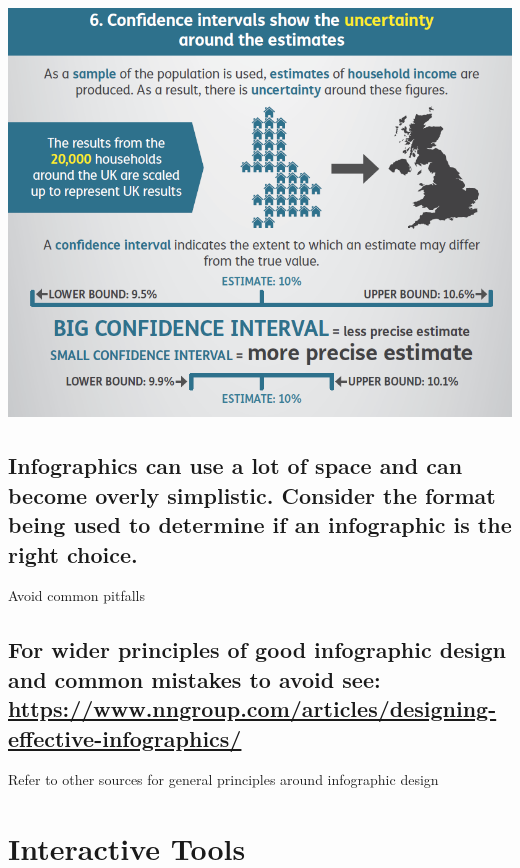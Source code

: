 \documentclass[]{book}
\begin{document}
\begin{center}\includegraphics{images/infographic} \end{center}

\subsection{Infographics can use a lot of space and can become overly
simplistic. Consider the format being used to determine if an
infographic is the right
choice.}\label{infographics-can-use-a-lot-of-space-and-can-become-overly-simplistic.-consider-the-format-being-used-to-determine-if-an-infographic-is-the-right-choice.}

 Avoid common pitfalls

\subsection{\texorpdfstring{For wider principles of good infographic
design and common mistakes to avoid see:
\url{https://www.nngroup.com/articles/designing-effective-infographics/}}{For wider principles of good infographic design and common mistakes to avoid see: https://www.nngroup.com/articles/designing-effective-infographics/}}\label{for-wider-principles-of-good-infographic-design-and-common-mistakes-to-avoid-see-httpswww.nngroup.comarticlesdesigning-effective-infographics}

 Refer to other sources for general principles around infographic design

\section{Interactive Tools}\label{interactive-tools}
\end{document}
